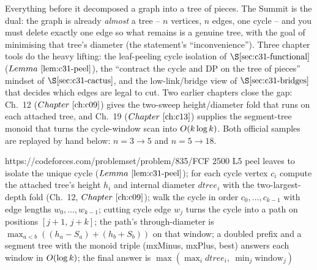 
\begin{notebox}
Everything before it decomposed a graph into a tree of pieces.  The Summit is
the dual: the graph is already \emph{almost} a tree -- \(n\) vertices, \(n\) edges,
one cycle -- and you must delete exactly one edge so what remains is a genuine
tree, with the goal of minimising that tree's diameter (the statement's
``inconvenience'').  Three chapter tools do the heavy lifting: the leaf-peeling
cycle isolation of \(\secref{c31-functional}\) (\(\lemref{c31-peel}\)), the
``contract the cycle and DP on the tree of pieces'' mindset of
\(\secref{c31-cactus}\), and the low-link/bridge view of \(\secref{c31-bridges}\)
that decides which edges are legal to cut.  Two earlier chapters close the gap:
Ch.~12 (\(\chref{c09}\)) gives the two-sweep height/diameter fold that runs on
each attached tree, and Ch.~19 (\(\chref{c13}\)) supplies the segment-tree monoid
that turns the cycle-window scan into \(O(k\log k)\).  Both official samples
are replayed by hand below: \(n{=}3\to 5\) and \(n{=}5\to 18\).
\end{notebox}

  {https://codeforces.com/problemset/problem/835/F}{CF 2500 L5}
  {peel leaves to isolate the unique cycle (\(\lemref{c31-peel}\)); for each cycle
   vertex \(c_i\) compute the attached tree's height \(h_i\) and internal diameter
   \(\mathit{dtree}_i\) with the two-largest-depth fold (Ch.~12, \(\chref{c09}\));
   walk the cycle in order \(c_0,\ldots,c_{k-1}\) with edge lengths
   \(w_0,\ldots,w_{k-1}\); cutting cycle edge \(w_j\) turns the cycle into a path on
   positions \([j{+}1,\,j{+}k]\); the path's through-diameter is
   \(\max_{a<b}((h_a-S_a)+(h_b+S_b))\) on that window; a doubled prefix and a
   segment tree with the monoid triple (mxMinus, mxPlus, best) answers each window
   in \(O(\log k)\); the final answer is
   \(\max(\max_i\mathit{dtree}_i,\ \min_j\mathrm{window}_j)\)}

